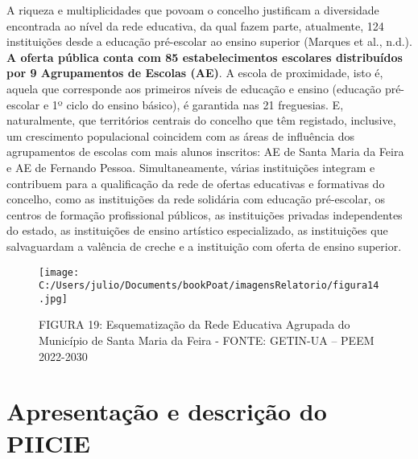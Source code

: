 \documentclass[
]{book}
\begin{document}
A riqueza e multiplicidades que povoam o concelho justificam a diversidade encontrada ao nível da rede educativa, da qual fazem parte, atualmente, 124 instituições desde a educação pré-escolar ao ensino superior (Marques et al., n.d.). \textbf{A oferta pública conta com 85 estabelecimentos escolares distribuídos por 9 Agrupamentos de Escolas (AE)}. A escola de proximidade, isto é, aquela que corresponde aos primeiros níveis de educação e ensino (educação pré-escolar e 1º ciclo do ensino básico), é garantida nas 21 freguesias. E, naturalmente, que territórios centrais do concelho que têm registado, inclusive, um crescimento populacional coincidem com as áreas de influência dos agrupamentos de escolas com mais alunos inscritos: AE de Santa Maria da Feira e AE de Fernando Pessoa. Simultaneamente, várias instituições integram e contribuem para a qualificação da rede de ofertas educativas e formativas do concelho, como as instituições da rede solidária com educação pré-escolar, os centros de formação profissional públicos, as instituições privadas independentes do estado, as instituições de ensino artístico especializado, as instituições que salvaguardam a valência de creche e a instituição com oferta de ensino superior.

\begin{figure}
\centering
\texttt{[image: C:/Users/julio/Documents/bookPoat/imagensRelatorio/figura14.jpg]}
\caption{FIGURA 19: Esquematização da Rede Educativa Agrupada do Município de Santa Maria da Feira - FONTE: GETIN-UA -- PEEM 2022-2030}
\end{figure}

\hypertarget{apresentauxe7uxe3o-e-descriuxe7uxe3o-do-piicie}{%
\section{\texorpdfstring{\textbf{Apresentação e descrição do PIICIE}}{Apresentação e descrição do PIICIE}}\label{apresentauxe7uxe3o-e-descriuxe7uxe3o-do-piicie}}
\end{document}
